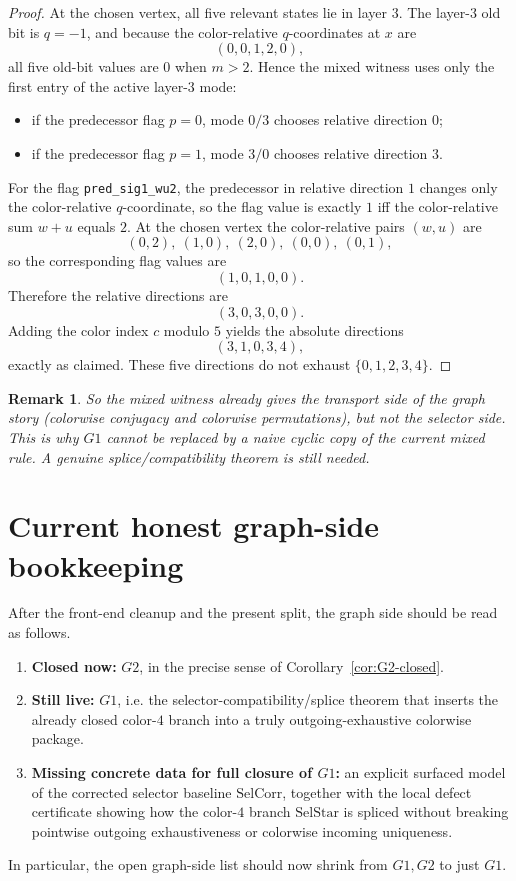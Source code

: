 \documentclass[11pt]{article}
\newtheorem{remark}[theorem]{Remark}
\newcommand{\SelCorr}{\mathrm{SelCorr}}
\newcommand{\SelStar}{\mathrm{SelStar}}
\begin{document}
\begin{proof}
At the chosen vertex, all five relevant states lie in layer $3$.
The layer-$3$ old bit is \(q=-1\), and because the color-relative
\(q\)-coordinates at \(x\) are
\[
(0,0,1,2,0),
\]
all five old-bit values are $0$ when \(m>2\).
Hence the mixed witness uses only the first entry of the active layer-$3$ mode:
\begin{itemize}[leftmargin=2.4em]
\item if the predecessor flag \(p=0\), mode \(0/3\) chooses relative direction \(0\);
\item if the predecessor flag \(p=1\), mode \(3/0\) chooses relative direction \(3\).
\end{itemize}
For the flag \texttt{pred\_sig1\_wu2}, the predecessor in relative direction $1$
changes only the color-relative \(q\)-coordinate, so the flag value is exactly
\(1\) iff the color-relative sum \(w+u\) equals $2$.
At the chosen vertex the color-relative pairs \((w,u)\) are
\[
(0,2),\ (1,0),\ (2,0),\ (0,0),\ (0,1),
\]
so the corresponding flag values are
\[
(1,0,1,0,0).
\]
Therefore the relative directions are
\[
(3,0,3,0,0).
\]
Adding the color index \(c\) modulo $5$ yields the absolute directions
\[
(3,1,0,3,4),
\]
exactly as claimed.
These five directions do not exhaust \(\{0,1,2,3,4\}\).
\end{proof}

\begin{remark}
So the mixed witness already gives the \emph{transport} side of the graph story
(colorwise conjugacy and colorwise permutations), but not the \emph{selector}
side.
This is why \(G1\) cannot be replaced by a naive cyclic copy of the current
mixed rule.
A genuine splice/compatibility theorem is still needed.
\end{remark}

\section{Current honest graph-side bookkeeping}
After the front-end cleanup and the present split, the graph side should be read
as follows.
\begin{enumerate}[label=\textup{(\arabic*)},leftmargin=2.8em]
\item \textbf{Closed now:} \(G2\), in the precise sense of
      Corollary~\ref{cor:G2-closed}.
\item \textbf{Still live:} \(G1\), i.e.
      the selector-compatibility/splice theorem that inserts the already closed
      color-$4$ branch into a truly outgoing-exhaustive colorwise package.
\item \textbf{Missing concrete data for full closure of \(G1\):}
      an explicit surfaced model of the corrected selector baseline
      \(\SelCorr\), together with the local defect certificate showing how the
      color-$4$ branch \(\SelStar\) is spliced without breaking pointwise
      outgoing exhaustiveness or colorwise incoming uniqueness.
\end{enumerate}
In particular, the open graph-side list should now shrink from \(G1,G2\) to
just \(G1\).
\end{document}
